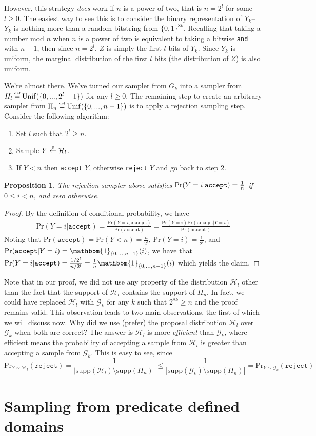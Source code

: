 \documentclass[10pt]{article}
\newtheorem{myprop}{Proposition}
\newcommand{\G}{\mathcal{G}}
\newcommand{\HH}{\mathcal{H}}
\newcommand{\ind}{\mathbbm{1}}
\newcommand{\abs}[1]{\left| #1 \right|}
\newcommand{\Unif}{\mathrm{Unif}}
\newcommand{\supp}{\mathrm{supp}}
\renewcommand{\Pr}{\mathrm{Pr}}
\newcommand\defeq{\stackrel{\mathclap{\normalfont\tiny\mbox{def}}}{=}}
\newcommand\rgets{\stackrel{\mathclap{\normalfont\tiny\mbox{\$}}}{\gets}}
\begin{document}
However, this strategy \emph{does} work if $n$ is a power of two, that is
$n=2^l$ for some $l \geq 0$. The easiest way to see this is to consider the
binary representation of $Y_k$-- $Y_k$ is nothing more than a random bitstring
from $\{0,1\}^{8k}$. Recalling that taking a number mod $n$ when $n$ is a power
of two is equivalent to taking a bitwise \verb|and| with $n-1$, then since
$n=2^{l}$, $Z$ is simply the first $l$ bits of $Y_k$. Since $Y_k$ is uniform,
the marginal distribution of the first $l$ bits (the distribution of $Z$) is
also uniform.

We're almost there. We've turned our sampler from $G_k$ into a sampler from
$H_l \defeq \Unif(\{0, ..., 2^l - 1\})$ for any $l \geq 0$. The remaining step
to create an arbitrary sampler from $\Pi_{n} \defeq \Unif(\{0,...,n-1\})$ is to
apply a rejection sampling step.  Consider the following algorithm:
\begin{enumerate}
  \item Set $l$ such that $2^l \geq n$.
  \item Sample $Y \rgets \HH_l$.
  \item If $Y < n$ then \verb|accept| $Y$, otherwise \verb|reject| $Y$ and go back to step 2.
\end{enumerate}
\begin{myprop}
The rejection sampler above satisfies $\Pr(Y=i | \normalfont{\texttt{accept}})
= \frac{1}{n}$ if $0 \leq i < n$, and zero otherwise.
\end{myprop}
\begin{proof}
By the definition of conditional probability, we have
\begin{align*}
  \Pr(Y=i|\texttt{accept}) = \frac{\Pr(Y=i, \texttt{accept})}{\Pr(\texttt{accept})} 
  = \frac{\Pr(Y=i)\Pr(\texttt{accept}|Y=i)}{\Pr(\texttt{accept})}
\end{align*}
Noting that $\Pr(\texttt{accept}) = \Pr(Y<n) = \frac{n}{2^l}$, $\Pr(Y=i)=\frac{1}{2^l}$, and 
$\Pr(\texttt{accept}|Y=i) = \ind_{\{0, ..., n-1\}}(i)$, we have 
that $\Pr(Y=i|\texttt{accept}) = \frac{1/2^l}{n/2^l} = \frac{1}{n} \ind_{\{0, ..., n-1\}}(i)$
which yields the claim.
\end{proof}
Note that in our proof, we did not use any property of the distribution $\HH_l$
other than the fact that the support of $\HH_l$ contains the support of $\Pi_n$.
In fact, we could have replaced $\HH_l$ with $\G_k$ for any $k$ such that $2^{8k}
\geq n$ and the proof remains valid. This observation leads to two main observations, the
first of which we will discuss now. Why did we use (prefer) the proposal distribution
$\HH_l$ over $\G_k$ when both are correct? The answer is $\HH_l$ is more \emph{efficient}
than $\G_k$, where efficient means the probability of accepting a sample from 
$\HH_l$ is greater than accepting a sample from $\G_k$. This is easy to see,
since 
\begin{equation*}
    \Pr_{Y \sim \HH_l}(\texttt{reject}) = \frac{1}{\abs{\supp(\HH_l) \setminus \supp(\Pi_n)}}
        \leq \frac{1}{\abs{\supp(\G_k)\setminus\supp(\Pi_n)}} = \Pr_{Y \sim \G_k}(\texttt{reject})
\end{equation*}

\section{Sampling from predicate defined domains}
\end{document}
